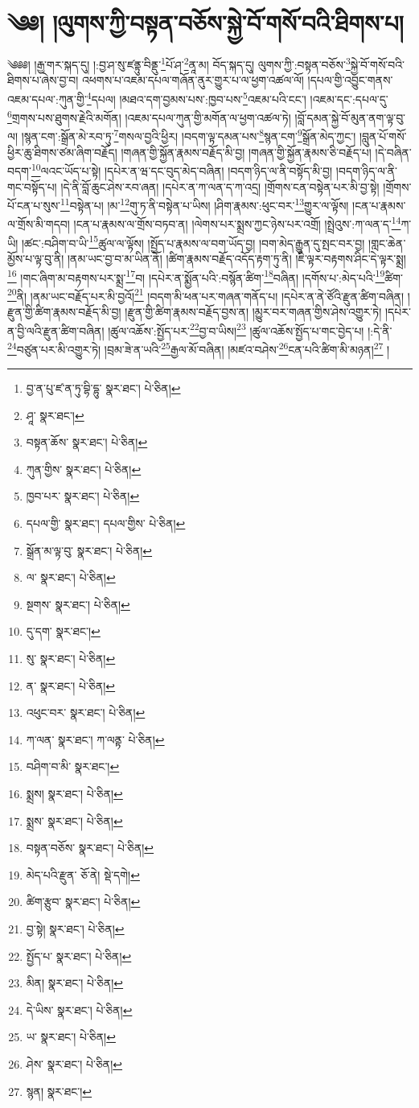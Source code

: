 \setcounter{footnote}{0} 
\chapter{༄༅། །ལུགས་ཀྱི་བསྟན་བཅོས་སྐྱེ་བོ་གསོ་བའི་ཐིགས་པ།}༄༅༅། །རྒྱ་གར་སྐད་དུ། །:བྱ་ཤ་སུ་ཛནྟུ་བིནྡུ་\footnote{བྱ་ན་པུ་ཛ་ན་ཏུ་བྷི་དྷུ་  སྣར་ཐང་།  པེ་ཅིན། }པོ་ཤ་\footnote{ཤཱ་  སྣར་ཐང་། }ནཱ་མ། བོད་སྐད་དུ། ལུགས་ཀྱི་:བསྟན་བཅོས་\footnote{བསྟན་ཆོས་  སྣར་ཐང་།  པེ་ཅིན། }སྐྱེ་བོ་གསོ་བའི་ཐིགས་པ་ཞེས་བྱ་བ། འཕགས་པ་འཇམ་དཔལ་གཞོན་ནུར་གྱུར་པ་ལ་ཕྱག་འཚལ་ལོ། །དཔལ་གྱི་འབྱུང་གནས་འཇམ་དཔལ་:ཀུན་གྱི་\footnote{ཀུན་གྱིས་  སྣར་ཐང་།  པེ་ཅིན། }དཔལ། །མཐའ་དག་བྱམས་པས་:ཁྱབ་པས་\footnote{ཁྱབ་པར་  སྣར་ཐང་།  པེ་ཅིན། }འཇམ་པའི་ངང་། །འཇམ་དང་:དཔལ་དུ་\footnote{དཔལ་གྱི་  སྣར་ཐང་། དཔལ་གྱིས་  པེ་ཅིན། }གྲགས་པས་ཐུགས་རྗེའི་མགོན། །འཇམ་དཔལ་ཀུན་གྱི་མགོན་ལ་ཕྱག་འཚལ་ཏེ། །བློ་དམན་སྐྱེ་བོ་མུན་ནག་ལྟ་བུ་ལ། །སྙན་ངག་:སྒྲོན་མེ་རབ་ཏུ་\footnote{སྒྲོན་མ་ལྟ་བུ་  སྣར་ཐང་།  པེ་ཅིན། }གསལ་བྱའི་ཕྱིར། །བདག་ལྟ་དམན་པས་\footnote{ལ་  སྣར་ཐང་།  པེ་ཅིན། }སྙན་ངག་\footnote{སྔགས་  སྣར་ཐང་།  པེ་ཅིན། }སྒྲོན་མེད་ཀྱང་། །བླུན་པོ་གསོ་ཕྱིར་ཆུ་ཐིགས་ཙམ་ཞིག་བརྗོད། །གཞན་གྱི་སྐྱོན་རྣམས་བརྗོད་མི་བྱ། །གཞན་གྱི་སྐྱོན་རྣམས་ཅི་བརྗོད་པ། །དེ་བཞིན་བདག་\footnote{དུ་དག་  སྣར་ཐང་། }ལའང་ཡོད་པ་སྟེ། །དཔེར་ན་ཝ་དང་བུད་མེད་བཞིན། །བདག་ཉིད་ལ་ནི་བསྟོད་མི་བྱ། །བདག་ཉིད་ལ་ནི་གང་བསྟོད་པ། །དེ་ནི་བློ་ཆུང་ཤེས་རབ་ཞན། །དཔེར་ན་ཀ་ལན་ད་ཀ་འདྲ། །གྲོགས་ངན་བསྟེན་པར་མི་བྱ་སྟེ། །གྲོགས་པོ་ངན་པ་སུས་\footnote{སུ་  སྣར་ཐང་།  པེ་ཅིན། }བསྟེན་པ། །མ་\footnote{ན་  སྣར་ཐང་།  པེ་ཅིན། }གུ་ཏ་ནི་བསྟེན་པ་ཡིས། །ཤིག་རྣམས་:ཕུང་བར་\footnote{འཕུང་བར་  སྣར་ཐང་།  པེ་ཅིན། }གྱུར་ལ་ལྟོས། །ངན་པ་རྣམས་ལ་གྲོས་མི་གདབ། །ངན་པ་རྣམས་ལ་གྲོས་བཏབ་ན། །ལེགས་པར་སྨྲས་ཀྱང་ཉེས་པར་འགྲོ། །སྤྲེའུས་:ཀ་ལན་ད་\footnote{ཀ་ལན་  སྣར་ཐང་། ཀ་ལནྟ་  པེ་ཅིན། }ཀ་ཡི། །ཚང་:བཤིག་བ་ཡི་\footnote{བཤིག་བ་མི་  སྣར་ཐང་། }ཚུལ་ལ་ལྟོས། །སྤྱོད་པ་རྣམས་ལ་བག་ཡོད་བྱ། །བག་མེད་རྒྱུན་དུ་སྤང་བར་བྱ། །གླང་ཆེན་མྱོས་པ་ལྟ་བུ་ནི། །ནམ་ཡང་བྱ་བ་མ་ཡིན་ནོ། །ཚིག་རྣམས་བརྗོད་འདོད་རྟག་ཏུ་ནི། །ཇི་ལྟར་བརྟགས་ཤིང་དེ་ལྟར་སྨྲ།\footnote{སྨྲས།  སྣར་ཐང་།  པེ་ཅིན། } །གང་ཞིག་མ་བརྟགས་པར་སྨྲ་\footnote{སྨྲས་  སྣར་ཐང་།  པེ་ཅིན། }བ། །དཔེར་ན་སྨྱོན་པའི་:བསྙོན་ཚིག་\footnote{བསྟན་བཅོས་  སྣར་ཐང་།  པེ་ཅིན། }བཞིན། །དགོས་པ་:མེད་པའི་\footnote{མེད་པའི་རྫུན་  ཅོ་ནེ།  སྡེ་དགེ། }ཚིག་\footnote{ཚིག་རྩུབ་  སྣར་ཐང་།  པེ་ཅིན། }ནི། །ནམ་ཡང་བརྗོད་པར་མི་བྱའོ།\footnote{བྱ་སྟེ།  སྣར་ཐང་།  པེ་ཅིན། } །བདག་མི་ཕན་པར་གཞན་གནོད་པ། །དཔེར་ན་ནེ་ཙོའི་རྫུན་ཚིག་བཞིན། །རྫུན་གྱི་ཚིག་རྣམས་བརྗོད་མི་བྱ། །རྫུན་གྱི་ཚིག་རྣམས་བརྗོད་བྱས་ན། །མྱུར་བར་གཞན་གྱིས་ཤེས་འགྱུར་ཏེ། །དཔེར་ན་བྱི་ལའི་རྫུན་ཚིག་བཞིན། །ཚུལ་འཆོས་:སྤྱོད་པར་\footnote{སྤྱོད་པ་  སྣར་ཐང་།  པེ་ཅིན། }བྱ་བ་ཡིས།\footnote{མིན།  སྣར་ཐང་།  པེ་ཅིན། } །ཚུལ་འཆོས་སྤྱོད་པ་གང་བྱེད་པ། །:དེ་ནི་\footnote{དེ་ཡིས་  སྣར་ཐང་།  པེ་ཅིན། }བཙུན་པར་མི་འགྱུར་ཏེ། །བྲམ་ཟེ་ན་ཡའི་\footnote{ཡ་  སྣར་ཐང་།  པེ་ཅིན། }རྒྱལ་མོ་བཞིན། །མཛའ་བཤེས་\footnote{ཤེས་  སྣར་ཐང་།  པེ་ཅིན། }ངན་པའི་ཚིག་མི་མཉན།\footnote{སྙན།  སྣར་ཐང་། } །
